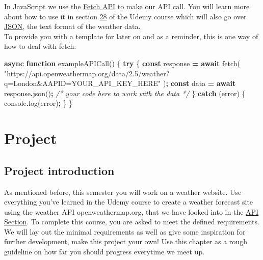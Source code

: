\documentclass[
]{book}
\newenvironment{Shaded}{\begin{snugshade}}{\end{snugshade}}
\newcommand{\BuiltInTok}[1]{#1}
\newcommand{\CommentTok}[1]{\textcolor[rgb]{0.56,0.35,0.01}{\textit{#1}}}
\newcommand{\ControlFlowTok}[1]{\textcolor[rgb]{0.13,0.29,0.53}{\textbf{#1}}}
\newcommand{\FunctionTok}[1]{\textcolor[rgb]{0.00,0.00,0.00}{#1}}
\newcommand{\KeywordTok}[1]{\textcolor[rgb]{0.13,0.29,0.53}{\textbf{#1}}}
\newcommand{\NormalTok}[1]{#1}
\newcommand{\OperatorTok}[1]{\textcolor[rgb]{0.81,0.36,0.00}{\textbf{#1}}}
\newcommand{\StringTok}[1]{\textcolor[rgb]{0.31,0.60,0.02}{#1}}
\begin{document}
In JavaScript we use the \href{https://developer.mozilla.org/de/docs/Web/API/Fetch_API}{Fetch API} to make our API call. You will learn more about how to use it in section \href{https://www.udemy.com/course/the-web-developer-bootcamp/learn/lecture/22051352\#overview}{28} of the Udemy course which will also go over \protect\hyperlink{json}{JSON}, the text format of the weather data.\\
To provide you with a template for later on and as a reminder, this is one way of how to deal with fetch:

\begin{Shaded}
\begin{Highlighting}[]
\KeywordTok{async} \KeywordTok{function} \FunctionTok{exampleAPICall}\NormalTok{() \{}
  \ControlFlowTok{try}\NormalTok{ \{}
    \KeywordTok{const}\NormalTok{ response }\OperatorTok{=} \ControlFlowTok{await} \FunctionTok{fetch}\NormalTok{(}
      \StringTok{"https://api.openweathermap.org/data/2.5/weather?q=London\&AAPID=YOUR\_API\_KEY\_HERE"}
\NormalTok{    )}\OperatorTok{;}
    \KeywordTok{const}\NormalTok{ data }\OperatorTok{=} \ControlFlowTok{await}\NormalTok{ response}\OperatorTok{.}\FunctionTok{json}\NormalTok{()}\OperatorTok{;}
    \CommentTok{/* your code here to work with the data */}
\NormalTok{  \} }\ControlFlowTok{catch}\NormalTok{ (error) \{}
    \BuiltInTok{console}\OperatorTok{.}\FunctionTok{log}\NormalTok{(error)}\OperatorTok{;}
\NormalTok{  \}}
\NormalTok{\}}
\end{Highlighting}
\end{Shaded}

\hypertarget{project}{%
\chapter{Project}\label{project}}

\hypertarget{project-introduction}{%
\section{Project introduction}\label{project-introduction}}

As mentioned before, this semester you will work on a weather website. Use everything you've learned in the Udemy course to create a weather forecast site using the weather API openweathermap.org, that we have looked into in the \protect\hyperlink{api}{API Section}. To complete this course, you are asked to meet the defined requirements. We will lay out the minimal requirements as well as give some inspiration for further development, make this project your own! Use this chapter as a rough guideline on how far you should progress everytime we meet up.
\end{document}
